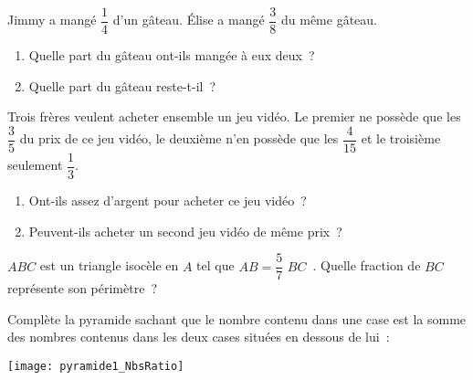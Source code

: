 \begin{exercice}
Jimmy a mangé $\dfrac{1}{4}$ d'un gâteau. Élise a mangé $\dfrac{3}{8}$ du même gâteau.
\begin{enumerate}
 \item Quelle part du gâteau ont-ils mangée à eux deux ?
 \item Quelle part du gâteau reste-t-il ?
 \end{enumerate}
\end{exercice}


\begin{exercice}
Trois frères veulent acheter ensemble un jeu vidéo. Le premier ne possède que les $\dfrac{3}{5}$ du prix de ce jeu vidéo, le deuxième n'en possède que les $\dfrac{4}{15}$ et le troisième seulement $\dfrac{1}{3}$. 
\begin{enumerate}
 \item Ont-ils assez d'argent pour acheter ce jeu vidéo ?
 \item Peuvent-ils acheter un second jeu vidéo de même prix ?
 \end{enumerate}
\end{exercice}


\begin{exercice}[Triangle]
$ABC$ est un triangle isocèle en $A$ tel que $AB = \dfrac{5}{7}\,\,BC$ . Quelle fraction de $BC$ représente son périmètre ?
\end{exercice}


\begin{exercice}[Pyramide]
Complète la pyramide sachant que le nombre contenu dans une case est la somme des nombres contenus dans les deux cases situées en dessous de lui :
\begin{center} \texttt{[image: pyramide1\_NbsRatio]} \end{center}
\end{exercice}


